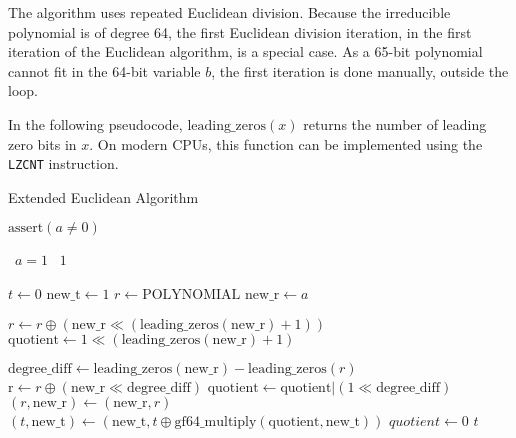 The algorithm uses repeated Euclidean division.
Because the irreducible polynomial is of degree 64, the first Euclidean division iteration, in the first iteration of the Euclidean algorithm, is a special case.
As a 65-bit polynomial cannot fit in the 64-bit variable $b$, the first iteration is done manually, outside the loop.

In the following pseudocode, $\text{leading\_zeros}(x)$ returns the number of leading zero bits in $x$.
On modern CPUs, this function can be implemented using the \texttt{LZCNT} instruction.

\begin{algorithm}
\caption{Extended Euclidean Algorithm}
\begin{algorithmic}

\State $\text{assert}(a \neq 0)$

\State \algorithmicif\ $a = 1$ \algorithmicthen\ \Return $1$ \algorithmicend \algorithmicif

\State $t \gets 0$
\State $\text{new\_t} \gets 1$
\State $r \gets \text{POLYNOMIAL}$
\State $\text{new\_r} \gets a$

\State $r \gets r \oplus (\text{new\_r} \ll (\text{leading\_zeros}(\text{new\_r}) + 1))$
\State $\text{quotient} \gets 1 \ll (\text{leading\_zeros}(\text{new\_r}) + 1)$

        \State $\text{degree\_diff} \gets \text{leading\_zeros}(\text{new\_r}) - \text{leading\_zeros}(r)$
        \State $\text{r} \gets r \oplus (\text{new\_r} \ll \text{degree\_diff})$
        \State $\text{quotient} \gets \text{quotient} | (1 \ll \text{degree\_diff})$
    \EndWhile
    \State $(r, \text{new\_r}) \gets (\text{new\_r}, r)$
    \State $(t, \text{new\_t}) \gets (\text{new\_t}, t \oplus \text{gf64\_multiply}(\text{quotient}, \text{new\_t}))$
    \State $quotient \gets 0$
\EndWhile
\State \Return $t$
\EndFunction
\end{algorithmic}
\end{algorithm}
